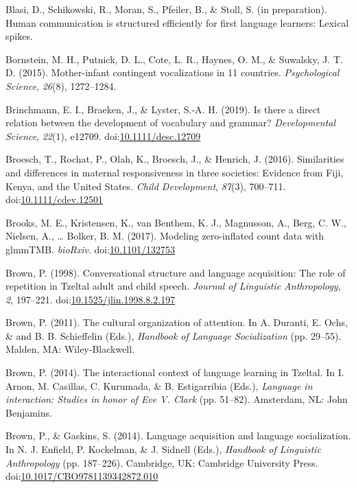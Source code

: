 \documentclass[floatsintext,man]{apa6}
\theoremstyle{definition}
\theoremstyle{definition}
\theoremstyle{definition}
\theoremstyle{remark}
\begin{document}
\hypertarget{ref-blasiIPhuman}{}
Blasi, D., Schikowski, R., Moran, S., Pfeiler, B., \& Stoll, S. (in
preparation). Human communication is structured efficiently for first
language learners: Lexical spikes.

\hypertarget{ref-bornstein2015mother}{}
Bornstein, M. H., Putnick, D. L., Cote, L. R., Haynes, O. M., \&
Suwalsky, J. T. D. (2015). Mother-infant contingent vocalizations in 11
countries. \emph{Psychological Science}, \emph{26}(8), 1272--1284.

\hypertarget{ref-brinchmann2019direct}{}
Brinchmann, E. I., Braeken, J., \& Lyster, S.-A. H. (2019). Is there a
direct relation between the development of vocabulary and grammar?
\emph{Developmental Science}, \emph{22}(1), e12709.
doi:\href{https://doi.org/10.1111/desc.12709}{10.1111/desc.12709}

\hypertarget{ref-broesch2016similarities}{}
Broesch, T., Rochat, P., Olah, K., Broesch, J., \& Henrich, J. (2016).
Similarities and differences in maternal responsiveness in three
societies: Evidence from Fiji, Kenya, and the United States. \emph{Child
Development}, \emph{87}(3), 700--711.
doi:\href{https://doi.org/10.1111/cdev.12501}{10.1111/cdev.12501}

\hypertarget{ref-brooks2017modeling}{}
Brooks, M. E., Kristensen, K., van Benthem, K. J., Magnusson, A., Berg,
C. W., Nielsen, A., \ldots{} Bolker, B. M. (2017). Modeling
zero-inflated count data with glmmTMB. \emph{bioRxiv}.
doi:\href{https://doi.org/10.1101/132753}{10.1101/132753}

\hypertarget{ref-brown1998conversational}{}
Brown, P. (1998). Conversational structure and language acquisition: The
role of repetition in Tzeltal adult and child speech. \emph{Journal of
Linguistic Anthropology}, \emph{2}, 197--221.
doi:\href{https://doi.org/10.1525/jlin.1998.8.2.197}{10.1525/jlin.1998.8.2.197}

\hypertarget{ref-brown2011cultural}{}
Brown, P. (2011). The cultural organization of attention. In A. Duranti,
E. Ochs, \& and B. B. Schieffelin (Eds.), \emph{Handbook of Language
Socialization} (pp. 29--55). Malden, MA: Wiley-Blackwell.

\hypertarget{ref-brown2014interactional}{}
Brown, P. (2014). The interactional context of language learning in
Tzeltal. In I. Arnon, M. Casillas, C. Kurumada, \& B. Estigarribia
(Eds.), \emph{Language in interaction: Studies in honor of Eve V. Clark}
(pp. 51--82). Amsterdam, NL: John Benjamins.

\hypertarget{ref-brown2014language}{}
Brown, P., \& Gaskins, S. (2014). Language acquisition and language
socialization. In N. J. Enfield, P. Kockelman, \& J. Sidnell (Eds.),
\emph{Handbook of Linguistic Anthropology} (pp. 187--226). Cambridge,
UK: Cambridge University Press.
doi:\href{https://doi.org/10.1017/CBO9781139342872.010}{10.1017/CBO9781139342872.010}
\end{document}
